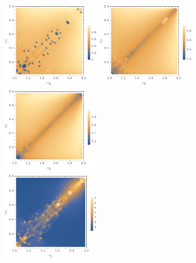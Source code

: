 \documentclass{report}
\begin{document}
\begin{figure}[p]
  \begin{adjustwidth}{-1in}{-1in}
    \centering
    \includegraphics[width=0.45\textwidth]{plot/energy-ratio-axion-1d.png}
    \includegraphics[width=0.45\textwidth]{plot/energy-ratio-axion-2d.png}
    \includegraphics[width=0.45\textwidth]{plot/energy-ratio-axion-3d.png} \\
    \includegraphics[width=0.45\textwidth]{plot/r_max-axion-1d.png}

\end{adjustwidth}
\end{figure}
\end{document}
